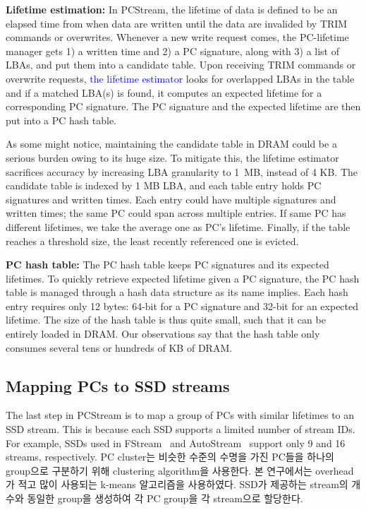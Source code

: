 \textbf{Lifetime estimation:}
In \textsf{PCStream}, the lifetime of data is defined to be an elapsed time
from when data are written until the data are invalided by TRIM commands or
overwrites. Whenever a new write request comes, the PC-lifetime manager gets 1)
a written time and 2) a PC signature, along with 3) a list of LBAs, and put
them into a candidate table. Upon receiving TRIM commands or overwrite
requests, \textcolor{blue}{the lifetime estimator} looks for overlapped LBAs in
the table and if a matched LBA(s) is found, it computes an expected lifetime
for a corresponding PC signature. The PC signature and the expected lifetime
are then put into a PC hash table.

As some might notice, maintaining the candidate table in DRAM could be a
serious burden owing to its huge size. To mitigate this, the lifetime estimator
sacrifices accuracy by increasing LBA granularity to 1~MB, instead of 4 KB.
The candidate table is indexed by 1 MB LBA, and each table entry holds PC
signatures and written times. Each entry could have multiple signatures and
written times; the same PC could span across multiple entries.  If same PC has
different lifetimes, we take the average one as PC's lifetime. Finally, if the
table reaches a threshold size, the least recently referenced one is evicted. 

\textbf{PC hash table:}
The PC hash table keeps PC signatures and its expected lifetimes. To quickly
retrieve expected lifetime given a PC signature, the PC hash table is managed
through a hash data structure as its name implies. Each hash entry requires
only 12 bytes: 64-bit for a PC signature and 32-bit for an expected lifetime.
The size of the hash table is thus quite small, such that it can be entirely
loaded in DRAM. Our observations say that the hash table only consumes several
tens or hundreds of KB of DRAM.



\subsection{Mapping PCs to SSD streams}

The last step in \textsf{\small PCStream} is to map
a group of PCs with similar lifetimes to an SSD stream.
This is because each SSD supports a limited number of stream IDs. For
example, SSDs used in \textsf{\small FStream}~\cite{FStream} and \textsf{\small AutoStream}~\cite{AutoStream}
support only 9 and 16 streams, respectively. 
{\color{blue} PC cluster는 비슷한 수준의 수명을 가진 PC들을 하나의 group으로 구분하기 위해 clustering algorithm을 사용한다.
본 연구에서는 overhead가 적고 많이 사용되는 k-means 알고리즘을 사용하였다.
SSD가 제공하는 stream의 개수와 동일한 group을 생성하여 각 PC group을 각 stream으로 할당한다.
}

